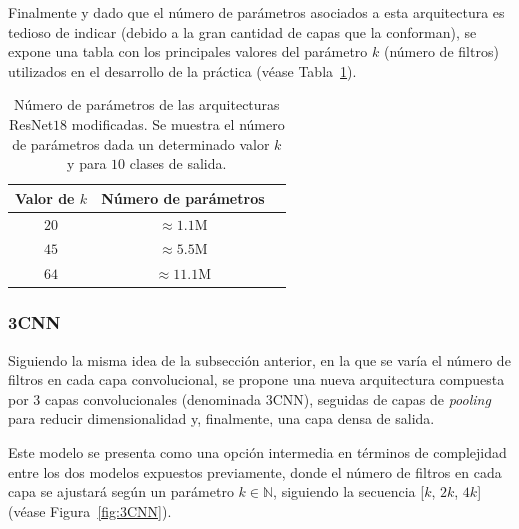 Finalmente y dado que el número de parámetros asociados a esta arquitectura es tedioso de indicar (debido a la gran cantidad de capas que la conforman), se expone una tabla con los principales valores del parámetro $k$ (número de filtros) utilizados en el desarrollo de la práctica (véase Tabla~\ref{tab:numero-parametrosresnet}).\newline

\begin{table}[ht]
    \centering
    \begin{tabular}{|c|c|c|}
    \hline
    \textbf{Valor de $k$}           & \textbf{Número de parámetros}                     
    \\ \hline
    $20$                  & $\approx 1.1$\space M                                            \\ \hline
    $45$                  & $\approx 5.5$\space M                                             \\ \hline
    $64$                  & $\approx 11.1$\space M                                             \\ \hline
    \end{tabular}
    \caption[Número de parámetros de las arquitecturas ResNet$18$ modificadas.]{Número de parámetros de las arquitecturas ResNet$18$ modificadas. Se muestra el número de parámetros dada un determinado valor $k$ y para $10$ clases de salida.}\label{tab:numero-parametrosresnet}
\end{table}

\subsubsection{3CNN}\label{subsubsec:3CNN}

Siguiendo la misma idea de la subsección anterior, en la que se varía el número de filtros en cada capa convolucional, se propone una nueva arquitectura compuesta por $3$ capas convolucionales (denominada $3$CNN), seguidas de capas de \textit{pooling} para reducir dimensionalidad y, finalmente, una capa densa de salida.\newline

Este modelo se presenta como una opción intermedia en términos de complejidad entre los dos modelos expuestos previamente, donde el número de filtros en cada capa se ajustará según un parámetro $k \in \mathbb{N}$, siguiendo la secuencia [$k$, $2k$, $4k$] (véase Figura~\ref{fig:3CNN}).\newline

